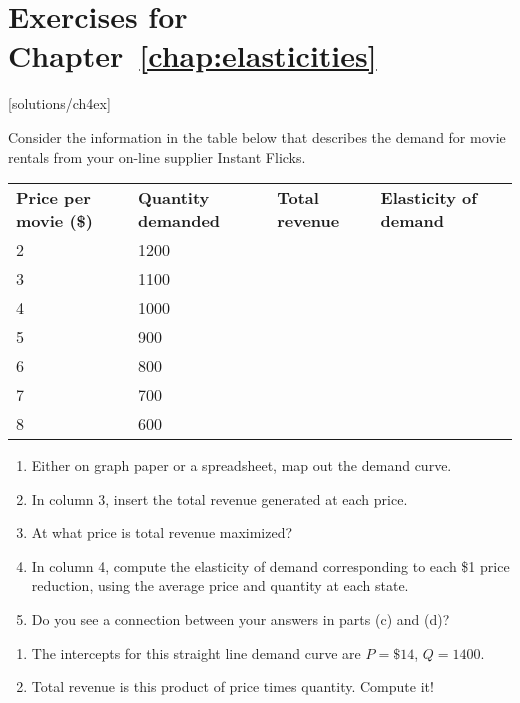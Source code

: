 \newpage
\section*{Exercises for Chapter~\ref{chap:elasticities}}

\begin{enumialphparenastyle}

[solutions/ch4ex]

\begin{ex}\label{ex:ch4ex1}
Consider the information in the table below that describes the demand for movie rentals from your on-line supplier Instant Flicks.
\begin{center}
\begin{tabu} to \linewidth {|X[1,c]X[1,c]X[1,c]X[1,c]|}	\hline
{}	\textbf{Price per movie (\$)}	&	\textbf{Quantity demanded}	&	\textbf{Total revenue}	&	\textbf{Elasticity of demand}	\\
						2	&	1200	&	&	\\
	3	&	1100	&	&	\\
						4	&	1000	&	&	\\
	5	&	900		&	&	\\
						6	&	800		&	&	\\
	7	&	700		&	&	\\
						8	&	600		&	&	\\	\hline
\end{tabu}
\end{center}
\begin{enumerate}
	\item	Either on graph paper or a spreadsheet, map out the demand curve.
	\item	In column 3, insert the total revenue generated at each price.
	\item	At what price is total revenue maximized?
	\item	In column 4, compute the elasticity of demand corresponding to each \$1 price reduction, using the average price and quantity at each state.
	\item	Do you see a connection between your answers in parts (c) and (d)?
\end{enumerate}
\begin{sol}
\begin{enumerate}
	\item	The intercepts for this straight line demand curve are $P=\$14$, $Q=1400$.
	\item	Total revenue is this product of price times quantity. Compute it!

\end{enumerate}
\end{sol}
\end{ex}
\end{enumialphparenastyle}

